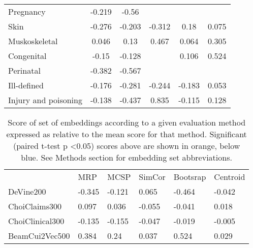 \documentclass[10pt]{article}
\def\blu#1{{\color{blu}#1}}
\def\ora#1{{\color{ora}#1}}
\begin{document}
\begin{table*}[]
\begin{tabular}{lccccc}
		Pregnancy            & -0.219                        & \blu{-0.56}  &                               &                              &                              \\
		Skin                 & \blu{-0.276} & -0.203                        & -0.312                        & 0.18                         & 0.075                        \\
		Muskoskeletal        & 0.046                         & 0.13                          & \ora{0.467}  & 0.064                        & \ora{0.305} \\
		Congenital           & -0.15                         & -0.128                        &                               & 0.106                        & \ora{0.524} \\
		Perinatal            & -0.382                        & \blu{-0.567} &                               &                              &                              \\
		Ill-defined          & -0.176                        & -0.281                        & -0.244                        & -0.183                       & 0.053                        \\
		Injury and poisoning & -0.138                        & \blu{-0.437} & \ora{0.835}  & -0.115                       & 0.128                       
	\end{tabular}
\end{table*}

\begin{table*}[]
	\caption{Score of set of embeddings according to a given evaluation method expressed as relative to the mean score for that method. Significant (paired t-test p \textless 0.05) scores above are shown in orange, below blue. See Methods section for embedding set abbreviations.}
	\label{tab:allembedresults}
	\begin{tabular}{llllll}
			            &MRP	        &MCSP	           &SimCor	    &Bootsrap	  &Centroid\\
		DeVine200       &\blu{-0.345}   &\blu{-0.121}	   &0.065	    &\blu{-0.464} &	-0.042 \\
		ChoiClaims300   &\ora{0.097}	&0.036	           &-0.055	    &-0.041	      &0.018   \\
		ChoiClinical300	&\blu{-0.135}	&\blu{-0.155}	   &-0.047	    &-0.019	      &-0.005  \\
		BeamCui2Vec500	&\ora{0.384}	&\ora{0.24}	       &0.037       &\ora{0.524}  &0.029   \\
	\end{tabular}
\end{table*}
\end{document}

